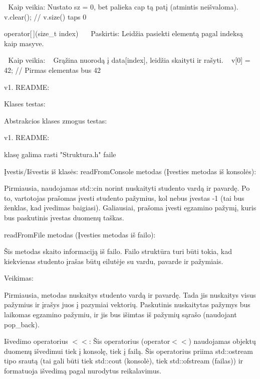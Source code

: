🔹 Kaip veikia\+: Nustato sz = 0, bet palieka cap tą patį (atmintis neišvaloma). v.\+clear(); // v.\+size() taps 0


\begin{DoxyEnumerate}
\item operator\mbox{[}$\,$\mbox{]}(size\+\_\+t index) ~\newline
 🔹 Paskirtis\+: Leidžia pasiekti elementą pagal indeksą kaip masyve.
\end{DoxyEnumerate}

🔹 Kaip veikia\+: ~\newline
 Grąžina nuorodą į data\mbox{[}index\mbox{]}, leidžia skaityti ir rašyti. ~\newline
 v\mbox{[}0\mbox{]} = 42; // Pirmas elementas bus 42 ~\newline


v1. README\+:

Klases  testas\+:



Abstrakcios klases zmogus testas\+:



v1. README\+:

 klasę galima rasti "{}\+Struktura.\+h"{} faile

Įvestis/\+Išvestis iš  klasės\+: read\+From\+Console metodas (Įvesties metodas iš konsolės)\+:

Pirmiausia, naudojamas std\+::cin norint nuskaityti studento vardą ir pavardę. Po to, vartotojas prašomas įvesti studento pažymius, kol nebus įvestas -\/1 (tai bus ženklas, kad įvedimas baigiasi). Galiausiai, prašoma įvesti egzamino pažymį, kuris bus paskutinis įvestas duomenų taškas.

read\+From\+File metodas (Įvesties metodas iš failo)\+:

Šis metodas skaito informaciją iš failo. Failo struktūra turi būti tokia, kad kiekvienas studento įrašas būtų eilutėje su vardu, pavarde ir pažymiais.

Veikimas\+:

Pirmiausia, metodas nuskaitys studento vardą ir pavardę. Tada jis nuskaitys visus pažymius ir įrašys juos į pazymiai vektorių. Paskutinis nuskaitytas pažymys bus laikomas egzamino pažymiu, ir jis bus išimtas iš pažymių sąrašo (naudojant pop\+\_\+back).

Išvedimo operatorius \texorpdfstring{$<$}{<}\texorpdfstring{$<$}{<}\+: Šis operatorius (operator\texorpdfstring{$<$}{<}\texorpdfstring{$<$}{<}) naudojamas objektų  duomenų išvedimui tiek į konsolę, tiek į failą. Šis operatorius priima std\+::ostream tipo srautą (tai gali būti tiek std\+::cout (konsolė), tiek std\+::ofstream (failas)) ir formatuoja išvedimą pagal nurodytus reikalavimus.

